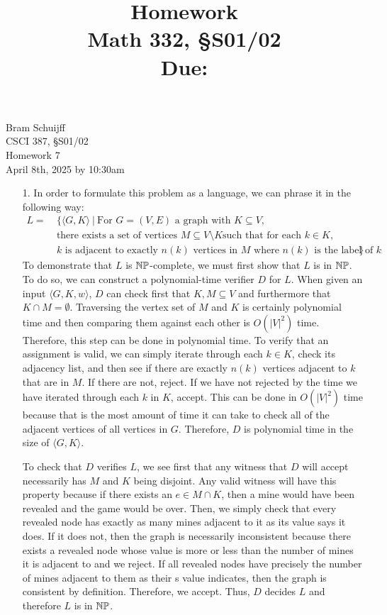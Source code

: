 \documentclass[11pt, reqno]{amsart}
\title[Homework \HW]{Homework \HW \\
  Math 332, \S S01/02\\
\small Due: \DUE}
\author{}
\theoremstyle{plain}
\theoremstyle{definition}
\newcounter{r}
\def\HW{7}
\def\DUE{April 8th, 2025 by 10:30am}
\begin{document}
\begin{flushleft}
  Bram Schuijff\\
  CSCI 387, \S S01/02\\
  Homework \HW\\
  \DUE
\end{flushleft}

\begin{enumerate}
  \item[1.] In order to formulate this problem as a language, we can phrase it
    in the following way:
    \begin{align*}
      L =~&\{\langle G, K\rangle~|~\text{For $G = (V, E)$ a graph with
        $K\subseteq V$,}\\
        &\text{there exists a set of vertices $M\subseteq V\setminus K$
        such that for each $k\in K$,}\\
        &\text{$k$ is adjacent to exactly $n(k)$ vertices in $M$ where
      $n(k)$ is the label of $k$}\}
    \end{align*}
    To demonstrate that $L$ is $\mathbb{N}\mathbb{P}$-complete, we must first show that $L$
    is in $\mathbb{N}\mathbb{P}$. To do so, we can construct a polynomial-time verifier $D$
    for $L$. When given an input $\langle G, K, w\rangle$, $D$ can check first
    that $K, M\subseteq V$ and furthermore that $K\cap M = \emptyset$.
    Traversing the vertex set of $M$ and $K$ is certainly polynomial time and
    then comparing them against each other is $O(|V|^2)$ time. Therefore, this
    step can be done in polynomial time. To verify that an assignment is valid,
    we can simply iterate through each $k\in K$, check its adjacency list, and
    then see if there are exactly $n(k)$ vertices adjacent to $k$ that are in
    $M$. If there are not, reject. If we have not rejected by the time we have
    iterated through each $k$ in $K$, accept. This can be done in $O(|V|^2)$
    time because that is the most amount of time it can take to check all of
    the adjacent vertices of all vertices in $G$. Therefore, $D$ is polynomial
    time in the size of $\langle G, K\rangle$.

    To check that $D$ verifies $L$, we see first that any witness that $D$ will
    accept necessarily has $M$ and $K$ being disjoint. Any valid witness will
    have this property because if there exists an $e\in M\cap K$, then a mine
    would have been revealed and the game would be over. Then, we simply check
    that every revealed node has exactly as many mines adjacent to it as its
    value says it does. If it does not, then the graph is necessarily
    inconsistent because there exists a revealed node whose value is more or
    less than the number of mines it is adjacent to and we reject. If all
    revealed nodes have precisely the number of mines adjacent to them as their
    s value indicates, then the graph is consistent by definition. Therefore,
    we accept. Thus, $D$ decides $L$ and therefore $L$ is in $\mathbb{N}\mathbb{P}$.


\end{enumerate}
\end{document}
